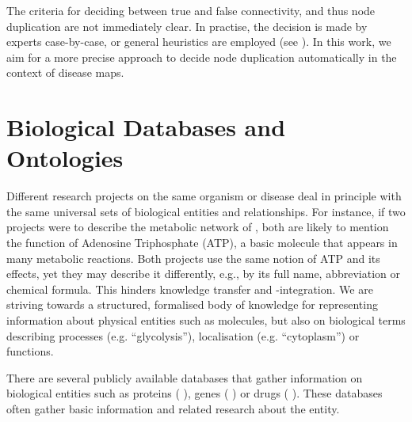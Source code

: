\documentclass[
	fontsize=10pt, %
	twoside=false, %
	secnumdepth=1, %
  toc=indentunnumbered %
]{kaobook}
\begin{document}
The criteria for deciding between true and false connectivity, and thus node
duplication are not immediately clear. In practise, the decision is made by
experts case-by-case, or general heuristics are employed (see
). In this work, we aim for a more precise approach to
decide node duplication automatically in the context of disease maps.




\section{Biological Databases and Ontologies}
\label{sec:ontologies}



Different research projects on the same organism or disease deal in principle
with the same universal sets of biological entities and relationships. For
instance, if two projects were to describe the metabolic network of \ecoli, both
are likely to mention the function of Adenosine Triphosphate (ATP), a basic
molecule that appears in many metabolic reactions. Both projects use the same
notion of ATP and its effects, yet they may describe it differently, e.g., by
its full name, abbreviation or
chemical formula. This hinders knowledge transfer and -integration. We are
striving towards a structured, formalised body of knowledge for representing
information about physical entities such as molecules, but also on biological terms
describing processes (e.g. ``glycolysis''), localisation (e.g. ``cytoplasm'') or
functions.

There are several publicly available databases that gather information on
biological entities such as proteins (
\cite{theuniprotconsortium_UniProtUniversalProtein_2021}), genes
( \cite{maglott_EntrezGeneGenecentered_2005}) or drugs
( \cite{wishart_DrugBankKnowledgebaseDrugs_2008}). These
databases often gather basic information and related research about the entity.
\end{document}
